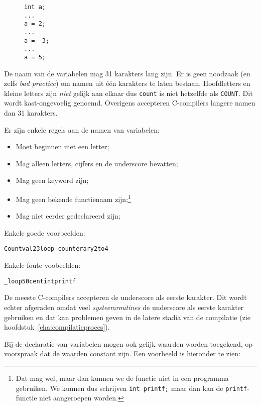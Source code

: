 \begin{figure}[!ht]
\begin{lstlisting}[caption=Meerdere toekenningen aan een variabele.]
int a;
...
a = 2;
...
a = -3;
...
a = 5;
\end{lstlisting}
\end{figure}

De naam van de variabelen mag 31 karakters lang zijn. Er is geen noodzaak (en zelfs \textsl{bad practice}) om namen uit één karakters te laten bestaan. Hoofdletters en kleine letters zijn \textsl{niet} gelijk aan elkaar dus \texttt{count} is niet hetzelfde als \texttt{COUNT}. Dit wordt kast-ongevoelig genoemd. Overigens accepteren C-compilers langere namen dan 31 karakters.

Er zijn enkele regels aan de namen van variabelen:

\begin{itemize}
\item Moet beginnen met een letter;
\item Mag alleen letters, cijfers en de underscore bevatten;
\item Mag geen keyword zijn;
\item Mag geen bekende functienaam zijn;\footnote{Dat mag wel, maar dan kunnen we de functie niet in een programma gebruiken. We kunnen dus schrijven \texttt{int printf;} maar dan kan de \texttt{printf}-functie niet aangeroepen worden.}
\item Mag niet eerder gedeclareerd zijn;
\end{itemize}

Enkele goede voorbeelden:

\hspace*{1em}\texttt{Count}\quad\texttt{val23}\quad\texttt{loop\_counter}\quad\texttt{ary2to4}

Enkele foute voobeelden:

\hspace*{1em}\texttt{\_loop}\quad\texttt{50cent}\quad\texttt{int}\quad\texttt{printf}

De meeste C-compilers accepteren de underscore als eerste karakter. Dit wordt echter afgeraden omdat veel \textsl{systeemroutines} de underscore als eerste karakter gebruiken en dat kan problemen geven in de latere stadia van de compilatie (zie hoofdstuk~\ref{cha:compilatieproces}).

Bij de declaratie van variabelen mogen ook gelijk waarden worden toegekend, op voorspraak dat de waarden constant zijn. Een voorbeeld is hieronder te zien:

